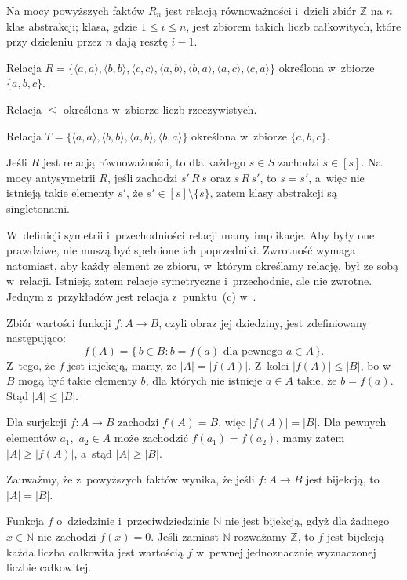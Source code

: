 Na mocy powyższych faktów $R_n$ jest relacją równoważności i~dzieli zbiór $\mathbb{Z}$ na $n$ klas abstrakcji;  klasa, gdzie $1\le i\le n$, jest zbiorem takich liczb całkowitych, które przy dzieleniu przez $n$ dają resztę $i-1$.

\exercise %
\subexercise
Relacja $R=\bigl\{\langle a,a\rangle,\langle b,b\rangle,\langle c,c\rangle,\langle a,b\rangle,\langle b,a\rangle,\langle a,c\rangle,\langle c,a\rangle\bigr\}$ określona w~zbiorze $\{a,b,c\}$.

\subexercise
Relacja $\le$ określona w~zbiorze liczb rzeczywistych.

\subexercise
Relacja $T=\bigl\{\langle a,a\rangle,\langle b,b\rangle,\langle a,b\rangle,\langle b,a\rangle\bigr\}$ określona w~zbiorze $\{a,b,c\}$.

\exercise %
Jeśli $R$ jest relacją równoważności, to dla każdego $s\in S$ zachodzi $s\in[s]$. Na mocy antysymetrii $R$, jeśli zachodzi $s'\,R\,s$ oraz $s\,R\,s'$, to $s=s'$, a~więc nie istnieją takie elementy $s'$, że $s'\in[s]\setminus\{s\}$, zatem klasy abstrakcji są singletonami.

\exercise %
W~definicji symetrii i~przechodniości relacji mamy implikacje. Aby były one prawdziwe, nie muszą być spełnione ich poprzedniki. Zwrotność wymaga natomiast, aby każdy element ze zbioru, w~którym określamy relację, był ze sobą w~relacji. Istnieją zatem relacje symetryczne i~przechodnie, ale nie zwrotne. Jednym z~przykładów jest relacja z~punktu~(c) w~.


\exercise %
\subexercise
Zbiór wartości funkcji $f\colon A\to B$, czyli obraz jej dziedziny, jest zdefiniowany następująco:
\[
	f(A) = \bigl\{\,b\in B:b=f(a)\text{ dla pewnego $a\in A$}\,\bigr\}.
\]
Z~tego, że $f$ jest injekcją, mamy, że $|A|=|f(A)|$. Z~kolei $|f(A)|\le|B|$, bo w~$B$ mogą być takie elementy $b$, dla których nie istnieje $a\in A$ takie, że $b=f(a)$. Stąd $|A|\le|B|$.

\subexercise
Dla surjekcji $f\colon A\to B$ zachodzi $f(A)=B$, więc $|f(A)|=|B|$. Dla pewnych elementów $a_1$,~$a_2\in A$ może zachodzić $f(a_1)=f(a_2)$, mamy zatem $|A|\ge|f(A)|$, a~stąd $|A|\ge|B|$.
\bigskip

Zauważmy, że z~powyższych faktów wynika, że jeśli $f\colon A\to B$ jest bijekcją, to $|A|=|B|$.

\exercise %
Funkcja $f$ o~dziedzinie i~przeciwdziedzinie $\mathbb{N}$ nie jest bijekcją, gdyż dla żadnego $x\in\mathbb{N}$ nie zachodzi $f(x)=0$. Jeśli zamiast $\mathbb{N}$ rozważamy $\mathbb{Z}$, to $f$ jest bijekcją -- każda liczba całkowita jest wartością $f$ w~pewnej jednoznacznie wyznaczonej liczbie całkowitej.

